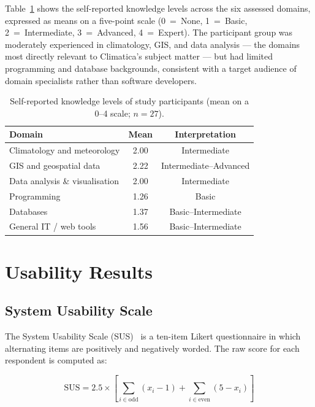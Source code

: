 Table~\ref{tab:knowledge} shows the self-reported knowledge levels across the
six assessed domains, expressed as means on a five-point scale
(0~=~None, 1~=~Basic, 2~=~Intermediate, 3~=~Advanced, 4~=~Expert). The
participant group was moderately experienced in climatology, GIS, and data
analysis --- the domains most directly relevant to Climatica's subject matter
--- but had limited programming and database backgrounds, consistent with a
target audience of domain specialists rather than software developers.

\begin{table}[H]
  \centering
  \caption{Self-reported knowledge levels of study participants
           (mean on a 0--4 scale; $n = 27$).}
  \label{tab:knowledge}
  \small
  \begin{tabular}{lcc}
    \toprule
    \textbf{Domain} & \textbf{Mean} & \textbf{Interpretation} \\
    \midrule
    Climatology and meteorology   & 2.00 & Intermediate \\
    GIS and geospatial data       & 2.22 & Intermediate--Advanced \\
    Data analysis \& visualisation & 2.00 & Intermediate \\
    Programming                    & 1.26 & Basic \\
    Databases                      & 1.37 & Basic--Intermediate \\
    General IT / web tools         & 1.56 & Basic--Intermediate \\
    \bottomrule
  \end{tabular}
  \normalsize
\end{table}

\section{Usability Results}\label{EVAL_SUS}

\subsection{System Usability Scale}\label{EVAL_SUS_SCORE}

The System Usability Scale (SUS)~\cite{brooke1996sus} is a ten-item Likert
questionnaire in which alternating items are positively and negatively worded.
The raw score for each respondent is computed as:

\[
  \text{SUS} = 2.5 \times \left[
    \sum_{i \in \text{odd}} (x_i - 1)
    + \sum_{i \in \text{even}} (5 - x_i)
  \right]
\]

